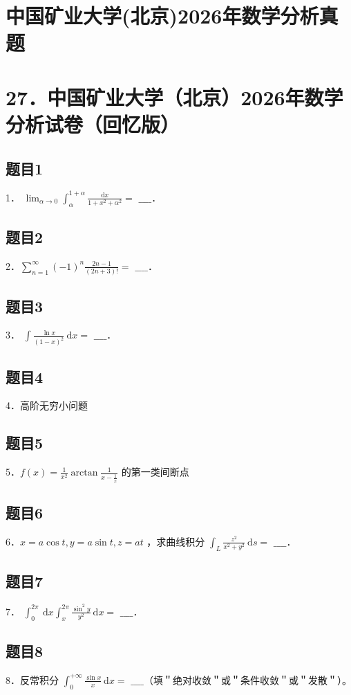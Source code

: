 \documentclass{article}
\begin{document}
\section*{中国矿业大学(北京)2026年数学分析真题}
\section*{27．中国矿业大学（北京）2026年数学分析试卷（回忆版）}

\subsection{题目1}
1． \(\lim _{\alpha \rightarrow 0} \int_{\alpha}^{1+\alpha} \frac{\mathrm{d} x}{1+x^{2}+\alpha^{2}}=\) \(\_\_\_\_\)．

\subsection{题目2}
2．\(\sum_{n=1}^{\infty}(-1)^{n} \frac{2 n-1}{(2 n+3)!}=\) \(\_\_\_\_\)．

\subsection{题目3}
3． \(\int \frac{\ln x}{(1-x)^{2}} \mathrm{~d} x=\) \(\_\_\_\_\)．

\subsection{题目4}
4．高阶无穷小问题

\subsection{题目5}
5．\(f(x)=\frac{1}{x^{2}} \arctan \frac{1}{x-\frac{1}{x}}\) 的第一类间断点

\subsection{题目6}
6．\(x=a \cos t, y=a \sin t, z=a t\) ，求曲线积分 \(\int_{L} \frac{z^{2}}{x^{2}+y^{2}} \mathrm{~d} s=\) \(\_\_\_\_\)．

\subsection{题目7}
7． \(\int_{0}^{2 \pi} \mathrm{~d} x \int_{x}^{2 \pi} \frac{\sin ^{2} y}{y^{2}} \mathrm{~d} x=\) \(\_\_\_\_\)．

\subsection{题目8}
8．反常积分 \(\int_{0}^{+\infty} \frac{\sin x}{x} \mathrm{~d} x=\) \(\_\_\_\_\)（填＂绝对收敛＂或＂条件收敛＂或＂发散＂）。
\end{document}
